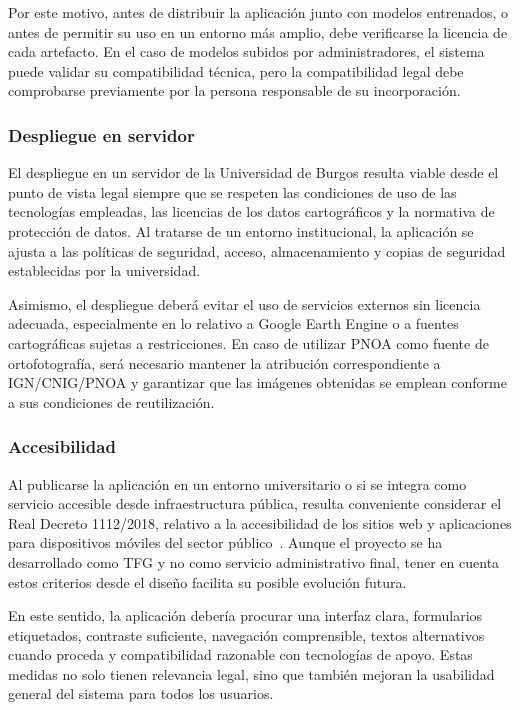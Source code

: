 Por este motivo, antes de distribuir la aplicación junto con modelos entrenados, o antes de permitir su uso en un entorno más amplio, debe verificarse la licencia de cada artefacto. En el caso de modelos subidos por administradores, el sistema puede validar su compatibilidad técnica, pero la compatibilidad legal debe comprobarse previamente por la persona responsable de su incorporación.

\subsubsection{Despliegue en servidor}

El despliegue en un servidor de la Universidad de Burgos resulta viable desde el punto de vista legal siempre que se respeten las condiciones de uso de las tecnologías empleadas, las licencias de los datos cartográficos y la normativa de protección de datos. Al tratarse de un entorno institucional, la aplicación se ajusta a las políticas de seguridad, acceso, almacenamiento y copias de seguridad establecidas por la universidad.

Asimismo, el despliegue deberá evitar el uso de servicios externos sin licencia adecuada, especialmente en lo relativo a Google Earth Engine o a fuentes cartográficas sujetas a restricciones. En caso de utilizar PNOA como fuente de ortofotografía, será necesario mantener la atribución correspondiente a IGN/CNIG/PNOA y garantizar que las imágenes obtenidas se emplean conforme a sus condiciones de reutilización.

\subsubsection{Accesibilidad}

Al publicarse la aplicación en un entorno universitario o si se integra como servicio accesible desde infraestructura pública, resulta conveniente considerar el Real Decreto 1112/2018, relativo a la accesibilidad de los sitios web y aplicaciones para dispositivos móviles del sector público~\cite{rd1112_2018}. Aunque el proyecto se ha desarrollado como TFG y no como servicio administrativo final, tener en cuenta estos criterios desde el diseño facilita su posible evolución futura.

En este sentido, la aplicación debería procurar una interfaz clara, formularios etiquetados, contraste suficiente, navegación comprensible, textos alternativos cuando proceda y compatibilidad razonable con tecnologías de apoyo. Estas medidas no solo tienen relevancia legal, sino que también mejoran la usabilidad general del sistema para todos los usuarios.

